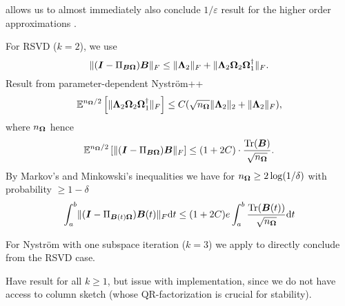  allows us to almost immediately
also conclude $1/\varepsilon$ result for the higher order approximations
.

For RSVD ($k=2$), we use \cite[theorem~9.1]{halko2011finding}
\begin{equation}
    \lVert (\boldsymbol{I} - \Pi_{\boldsymbol{B}\boldsymbol{\Omega}}) \boldsymbol{B} \rVert _F \leq \lVert \boldsymbol{\Lambda}_2 \rVert _F + \lVert \boldsymbol{\Lambda}_2 \boldsymbol{\Omega}_2 \boldsymbol{\Omega}_1^{\dagger} \rVert _F.
\end{equation}
Result from parameter-dependent Nyström++ 
\begin{equation}
    \mathbb{E}^{n_{\mtx{\Omega}}/2} \left[ \lVert \mtx{\Lambda}_2 \mtx{\Omega}_2 \mtx{\Omega}_1^{\dagger} \rVert _F \right] \leq C(\sqrt{n_{\mtx{\Omega}}} \lVert \mtx{\Lambda}_2 \rVert _2 + \lVert \mtx{\Lambda}_2 \rVert _F),%
\end{equation}
where $n_{\boldsymbol{\Omega}}$ hence
\begin{equation}
    \mathbb{E}^{n_{\boldsymbol{\Omega}}/2} \left[ \lVert (\boldsymbol{I} - \Pi_{\boldsymbol{B}\boldsymbol{\Omega}}) \boldsymbol{B} \rVert _F \right]
    \leq (1 + 2C) \cdot \frac{\operatorname{Tr}(\boldsymbol{B})}{\sqrt{n_{\boldsymbol{\Omega}}}}.
\end{equation}
By Markov's and Minkowski's inequalities we have for $n_{\boldsymbol{\Omega}} \geq 2 \log(1/\delta)$ with probability $\geq 1 - \delta$
\begin{equation}
    \int_{a}^{b}\lVert  (\boldsymbol{I} - \Pi_{\boldsymbol{B}(t)\boldsymbol{\Omega}}) \boldsymbol{B}(t) \rVert _F \mathrm{d}t \leq (1 + 2C) e \int_{a}^{b}\frac{\operatorname{Tr}(\boldsymbol{B}(t))}{\sqrt{n_{\boldsymbol{\Omega}}}} \mathrm{d}t
\end{equation}

For Nystr\"om with one subspace iteration ($k=3$) we apply \cite[lemma~5.2]{tropp2023randomized}
to directly conclude from the RSVD case.

Have result for all $k \geq 1$, but issue with implementation, since we do not
have access to column sketch (whose QR-factorization is crucial for stability).

